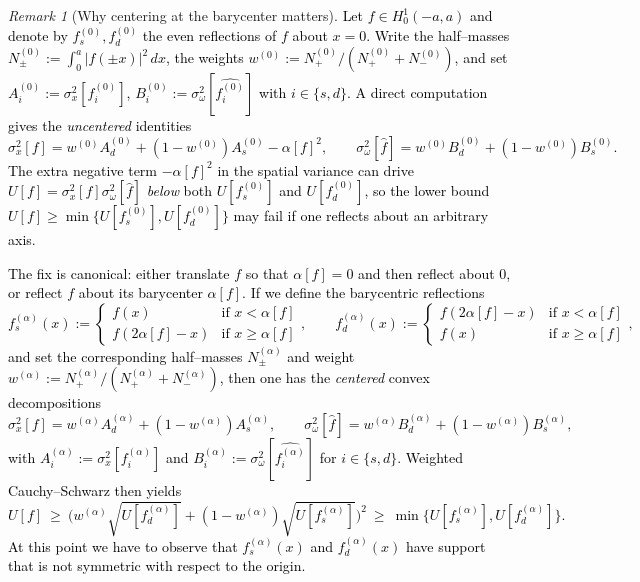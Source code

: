 \documentclass[preprint,hidelinks,authoryear]{elsarticle}
\theoremstyle{plain}
\theoremstyle{definition}
\theoremstyle{remark}
\newtheorem{remark}[theorem]{Remark}
\begin{document}
\begin{remark}[Why centering at the barycenter matters]
\textcolor{black}{Let $f\in H^1_0(-a,a)$ and denote by $f_s^{(0)},f_d^{(0)}$ the even reflections of $f$ about $x=0$.
Write the half–masses $N_\pm^{(0)}:=\int_{0}^{a}|f(\pm x)|^2\,dx$, the weights
$w^{(0)}:=N_+^{(0)}/(N_+^{(0)}+N_-^{(0)})$, and set
$A_{i}^{(0)}:=\sigma_x^2[f_{i}^{(0)}]$, $B_{i}^{(0)}:=\sigma_\omega^2[\widehat{f_{i}^{(0)}}]$ with $i\in\{s,d\}$.
A direct computation gives the \emph{uncentered} identities
$$
\sigma_x^2[f]=w^{(0)}A_d^{(0)}+(1-w^{(0)})A_s^{(0)}-\alpha[f]^2,
\qquad
\sigma_\omega^2[\hat f]=w^{(0)}B_d^{(0)}+(1-w^{(0)})B_s^{(0)}.
$$
The extra negative term $-\alpha[f]^2$ in the spatial variance can drive
$U[f]=\sigma_x^2[f]\sigma_\omega^2[\hat f]$ \emph{below} both $U[f_s^{(0)}]$ and $U[f_d^{(0)}]$,
so the lower bound $U[f]\ge\min\{U[f_s^{(0)}],U[f_d^{(0)}]\}$ may fail if one reflects about an
arbitrary axis.}

\textcolor{black}{The fix is canonical: either translate $f$ so that $\alpha[f]=0$ and then reflect about $0$,
or reflect $f$ about its barycenter $\alpha[f]$. If we define the barycentric reflections
$$
f_s^{(\alpha)}(x):=\begin{cases} f(x) & \text{if } x<\alpha[f]\\ f(2\alpha[f]-x)& \text{if } x\ge \alpha[f]\end{cases},
\qquad
f_d^{(\alpha)}(x):=\begin{cases} f(2\alpha[f]-x)& \text{if  } x<\alpha[f]\\ f(x)& \text{if } x\ge \alpha[f]\end{cases},
$$
and set the corresponding half–masses $N_\pm^{(\alpha)}$ and weight $w^{(\alpha)}:=N_+^{(\alpha)}/(N_+^{(\alpha)}+N_-^{(\alpha)})$, 
then one has the \emph{centered} convex decompositions
$$
\sigma_x^2[f]=w^{(\alpha)}A_d^{(\alpha)}+(1-w^{(\alpha)})A_s^{(\alpha)},
\qquad
\sigma_\omega^2[\hat f]=w^{(\alpha)}B_d^{(\alpha)}+(1-w^{(\alpha)})B_s^{(\alpha)},
$$
with $A_{i}^{(\alpha)}:=\sigma_x^2[f_{i}^{(\alpha)}]$ and
$B_{i}^{(\alpha)}:=\sigma_\omega^2[\widehat{f_{i}^{(\alpha)}}]$ for $i\in\{s,d\}$.
Weighted Cauchy–Schwarz then yields
$$
U[f]\ \ge\ \Big(w^{(\alpha)}\sqrt{U[f_d^{(\alpha)}]}+(1-w^{(\alpha)})\sqrt{U[f_s^{(\alpha)}]}\Big)^2
\ \ge\ \min\{U[f_s^{(\alpha)}],U[f_d^{(\alpha)}]\}.
$$
At this point we have to observe that $f_s^{(\alpha)}(x)$ and $f_d^{(\alpha)}(x)$ have support that is not symmetric with respect to the origin.}
\end{remark}
\end{document}
